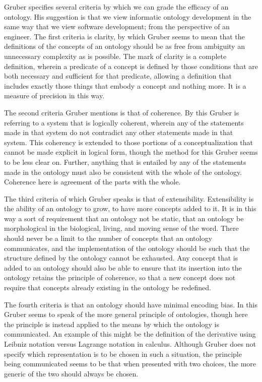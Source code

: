 \documentclass[letterpaper, 10 pt, conference]{ieeeconf}
\begin{document}
Gruber specifies several criteria by which we can grade the efficacy of an ontology. His suggestion is that we view informatic ontology development in the same way that we view software development; from the perspective of an engineer. The first criteria is clarity, by which Gruber seems to mean that the definitions of the concepts of an ontology should be as free from ambiguity an unnecessary complexity as is possible. The mark of clarity is a complete definition, wherein a predicate of a concept is defined by those conditions that are both necessary and sufficient for that predicate, allowing a definition that includes exactly those things that embody a concept and nothing more. It is a measure of precision in this way.

The second criteria Gruber mentions is that of coherence. By this Gruber is referring to a system that is logically coherent, wherein any of the statements made in that system do not contradict any other statements made in that system. This coherency is extended to those portions of a conceptualization that cannot be made explicit in logical form, though the method for this Gruber seems to be less clear on. Further, anything that is entailed by any of the statements made in the ontology must also be consistent with the whole of the ontology. Coherence here is agreement of the parts with the whole.

The third criteria of which Gruber speaks is that of extensibility. Extensibility is the ability of an ontology to grow, to have more concepts added to it. It is in this way a sort of requirement that an ontology not be static, that an ontology be morphological in the biological, living, and moving sense of the word. There should never be a limit to the number of concepts that an ontology communicates, and the implementation of the ontology should be such that the structure defined by the ontology cannot be exhausted. Any concept that is added to an ontology should also be able to ensure that its insertion into the ontology retains the principle of coherence, so that a new concept does not require that concepts already existing in the ontology be redefined.

The fourth criteria is that an ontology should have minimal encoding bias. In this Gruber seems to speak of the more general principle of ontologies, though here the principle is instead applied to the means by which the ontology is communicated. An example of this might be the definition of the derivative using Leibniz notation versus Lagrange notation in calculus. Although Gruber does not specify which representation is to be chosen in such a situation, the principle being communicated seems to be that when presented with two choices, the more generic of the two should always be chosen.
\end{document}
